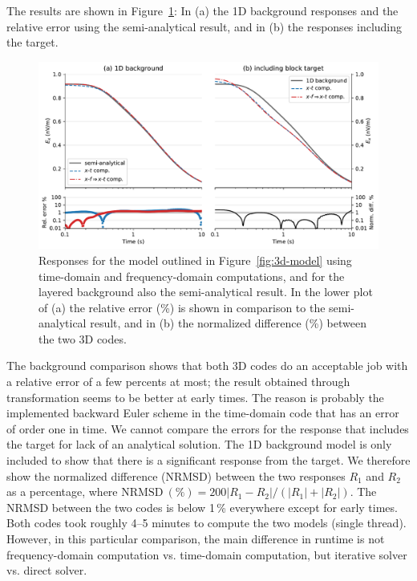 \documentclass[extra, camera,%
    onecolumn,   %
    referee,     %
]{gji}
\newlength{\fwidth}
\newcommand{\mr}[1]{\mathrm{#1}}
\begin{document}
The results are shown in Figure~\ref{fig:3d-result}: In (a) the 1D background
responses and the relative error using the semi-analytical result, and in (b)
the responses including the target.
%
\begin{figure}
  \centering
  \includegraphics[width=\fwidth]{10-3d-result}
  \caption{Responses for the model outlined in Figure~\ref{fig:3d-model} using
    time-domain and frequency-domain computations, and for the layered
    background also the semi-analytical result. In the lower plot of (a) the
    relative error (\%) is shown in comparison to the semi-analytical result,
    and in (b) the normalized difference (\%) between the two 3D codes.
    }
  \label{fig:3d-result}
\end{figure}
%
The background comparison shows that both 3D codes do an acceptable job with a
relative error of a few percents at most; the result obtained through
transformation seems to be better at early times. The reason is probably the
implemented backward Euler scheme in the time-domain code that has an error of
order one in time. We cannot compare the errors for the response that includes
the target for lack of an analytical solution. The 1D background model is only
included to show that there is a significant response from the target. We
therefore show the normalized difference (NRMSD) between the two responses
$R_1$ and $R_2$ as a percentage, where $\mr{NRMSD~(\%)} = 200|R_1 - R_2|/(|R_1|
+ |R_2|)$. The NRMSD between the two codes is below 1\,\% everywhere except for
early times. Both codes took roughly 4--5 minutes to compute the two models
(single thread). However, in this particular comparison, the main difference in
runtime is not frequency-domain computation vs. time-domain computation, but
iterative solver vs. direct solver.
\end{document}
